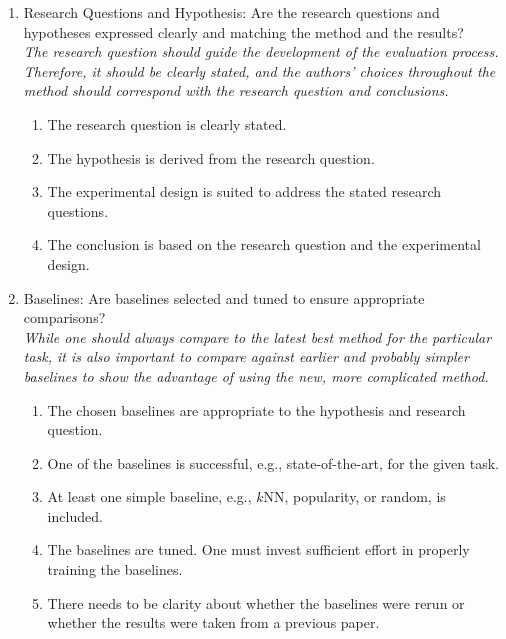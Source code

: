 \documentclass{article}
\begin{document}
\begin{enumerate}
    \item Research Questions and Hypothesis: 
    Are the research questions and hypotheses expressed clearly and matching the method and the results? \\
    \emph{The research question should guide the development of the evaluation process. Therefore, it should be clearly stated, and the authors' choices throughout the method should correspond with the research question and conclusions.}
    \begin{enumerate} [label*=\arabic*.]
        \item The research question is clearly stated.
        \item The hypothesis is derived from the research question.
        \item The experimental design is suited to address the stated research questions.
        \item The conclusion is based on the research question and the experimental design.
    \end{enumerate}
    
    \item Baselines: 
    Are baselines selected and tuned to ensure appropriate comparisons? \\
    \emph{While one should always compare to the latest best method for the particular task, it is also important to compare against earlier and probably simpler baselines to show the advantage of using the new, more complicated method.}
    \begin{enumerate} [label*=\arabic*.]
        \item The chosen baselines are appropriate to the hypothesis and research question.
        \item One of the baselines is successful, e.g., state-of-the-art, for the given task. 
        \item At least one simple baseline, e.g., $k$NN, popularity, or random, is included.
        \item The baselines are tuned. One must invest sufficient effort in properly training the baselines. 
        \item There needs to be clarity about whether the baselines were rerun or whether the results were taken from a previous paper.
    \end{enumerate}



\end{enumerate}
\end{document}
